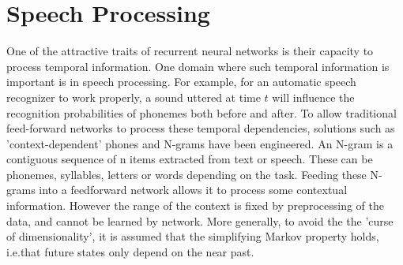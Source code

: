 \documentclass[12pt,oneside]{CUNY_CS_PhD}
\begin{document}
\section{Speech Processing}
One of the attractive traits of recurrent neural networks is their capacity to process temporal information. One domain where such temporal information is important is in speech processing. For example, for an automatic speech recognizer to work properly, a sound uttered at time $t$ will influence the recognition probabilities of phonemes both before and after. To allow traditional feed-forward networks to process these temporal dependencies, solutions such as 'context-dependent' phones and N-grams have been engineered. An N-gram is a contiguous sequence of n items extracted from text or speech. These can be phonemes, syllables, letters or words depending on the task. Feeding these N-grams into a feedforward network allows it to process some contextual information. However the range of the context is fixed by preprocessing of the data, and cannot be learned by network. More generally, to avoid the the 'curse of dimensionality', it is assumed that the simplifying Markov property holds, i.e.that future states only depend on the near past.
\end{document}
